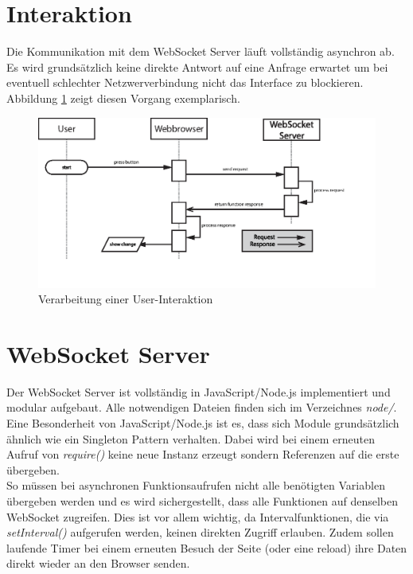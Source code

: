 \section{Interaktion}
Die Kommunikation mit dem WebSocket Server läuft vollständig asynchron ab. Es wird grundsätzlich keine direkte Antwort auf eine Anfrage erwartet um bei eventuell schlechter Netzwerverbindung nicht das Interface zu blockieren. Abbildung \ref{fig:interaction} zeigt diesen Vorgang exemplarisch.

\begin{figure}[ht]
  \includegraphics[width = \textwidth]{documentation/images/sendRequest.eps}
  \caption{Verarbeitung einer User-Interaktion}
  \label{fig:interaction}
\end{figure}


\section{WebSocket Server}
Der WebSocket Server ist vollständig in JavaScript/Node.js implementiert und modular aufgebaut. Alle notwendigen Dateien finden sich im Verzeichnes \textit{node/}.\\
Eine Besonderheit von JavaScript/Node.js ist es, dass sich Module grundsätzlich ähnlich wie ein Singleton Pattern verhalten. Dabei wird bei einem erneuten Aufruf von \textit{require()} keine neue Instanz erzeugt sondern Referenzen auf die erste übergeben.\\
So müssen bei asynchronen Funktionsaufrufen nicht alle benötigten Variablen übergeben werden und es wird sichergestellt, dass alle Funktionen auf denselben WebSocket zugreifen. Dies ist vor allem wichtig, da Intervalfunktionen, die via \textit{setInterval()} aufgerufen werden, keinen direkten Zugriff erlauben. Zudem sollen laufende Timer bei einem erneuten Besuch der Seite (oder eine reload) ihre Daten direkt wieder an den Browser senden.\\

